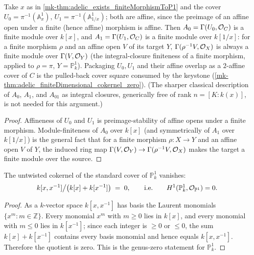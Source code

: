 \begin{proposition}
  \label{mk-thm:adelic_chart_finite_over_P1}
  \leanok
  Take \(x\) as in \ref{mk-thm:adelic_exists_finiteMorphismToP1} and the
  cover \(U_0 = \pi^{-1}(\mathbb{A}^1_x)\),
  \(U_1 = \pi^{-1}(\mathbb{A}^1_{1/x})\); both are affine, since the
  preimage of an affine open under a finite (hence affine) morphism is
  affine. Then \(A_0 = \Gamma(U_0, \mathcal{O}_{C})\) is a finite module over
  \(k[x]\), and \(A_1 = \Gamma(U_1, \mathcal{O}_{C})\) is a finite module over
  \(k[1/x]\): for a finite morphism \(\rho\) and an affine open \(V\) of
  its target \(Y\), \(\Gamma(\rho^{-1}V, \mathcal{O}_{X})\) is always a finite
  module over \(\Gamma(V, \mathcal{O}_{Y})\) (the integral-closure finiteness
  of a finite morphism, applied to \(\rho = \pi\), \(Y = \mathbb{P}^1_k\)).
  Packaging \(U_0, U_1\) and their affine overlap as a
  \(2\)-affine cover of \(C\) is the pulled-back cover square consumed by
  the keystone (\ref{mk-thm:adelic_finiteDimensional_cokernel_zero}). (The
  sharper classical description of \(A_0\), \(A_1\), and \(A_{01}\) as
  integral closures, generically free of rank \(n=[K:k(x)]\), is not
  needed for this argument.)
\end{proposition}
\begin{proof}
  \leanok
  Affineness of \(U_0\) and \(U_1\) is preimage-stability of affine opens
  under a finite morphism. Module-finiteness of \(A_0\) over \(k[x]\)
  (and symmetrically of \(A_1\) over \(k[1/x]\)) is the general fact that
  for a finite morphism \(\rho \colon X \to Y\) and an affine open \(V\)
  of \(Y\), the induced ring map \(\Gamma(V, \mathcal{O}_{Y}) \to
  \Gamma(\rho^{-1}V, \mathcal{O}_{X})\) makes the target a finite module over
  the source.
\end{proof}
\begin{lemma}
  \label{mk-thm:adelic_cokernel_P1_zero}
  \leanok

  The untwisted cokernel of the standard cover of \(\mathbb{P}^1_k\)
  vanishes:
  \[
    k[x, x^{-1}] \big/ \bigl(k[x] + k[x^{-1}]\bigr) \;=\; 0,
    \qquad\text{i.e.}\qquad H^1(\mathbb{P}^1_k, \mathcal{O}_{\mathbb{P}^1}) = 0.
  \]
\end{lemma}
\begin{proof}
  \leanok
  As a \(k\)-vector space \(k[x, x^{-1}]\) has basis the Laurent
  monomials \(\{x^m : m \in \mathbb{Z}\}\). Every monomial \(x^m\) with
  \(m \ge 0\) lies in \(k[x]\), and every monomial with \(m \le 0\) lies
  in \(k[x^{-1}]\); since each integer is \(\ge 0\) or \(\le 0\), the sum
  \(k[x] + k[x^{-1}]\) contains every basis monomial and hence equals
  \(k[x, x^{-1}]\). Therefore the quotient is zero. This is the genus-zero
  statement for \(\mathbb{P}^1_k\).
\end{proof}

